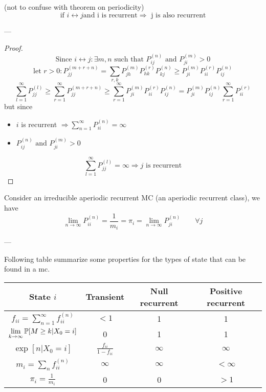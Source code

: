 	\begin{theorem}
		(not to confuse with theorem on periodicity)
		$$\text{if } i\leftrightarrow j \text{and i is recurrent} \Rightarrow \text{ j is also recurrent}$$
	\end{theorem}
	---
	\begin{proof}
		$$\text{Since } i\leftrightarrow j : \exists m,n \text{ such that } P_{ij}^{(n)} \text{ and } P_{ji}^{(m)} > 0$$
		$$\text{let } r>0 : P_{jj}^{(m+r+n)} = \sum\limits_{r, k} P_{jh}^{(m)} P_{hk}^{(r)} P_{kj}^{(n)} \geq P_{ji}^{(m)}  P_{ii}^{(r)}  P_{ij}^{(n)}$$
		$$\sum\limits_{l=1}^\infty P_{jj}^{(l)} \geq \sum\limits_{r=1}^\infty P_{jj}^{(m+r+n)} \geq \sum\limits_{r=1}^\infty P_{ji}^{(m)}  P_{ii}^{(r)}  P_{ij}^{(n)} = P_{ji}^{(m)} P_{ij}^{(n)} \sum\limits_{r=1}^\infty P_{ii}^{(r)}$$
		but since \begin{itemize}
		\item$i$ is recurrent $\Rightarrow \sum\limits_{n=1}^\infty P_{ii}^{(n)} = \infty$
		\item $P_{ij}^{(n)} \text{ and } P_{ji}^{(m)} > 0$
		\end{itemize}
		$$\sum\limits_{l=1}^\infty P_{jj}^{(l)} = \infty \Rightarrow j \text{ is recurrent}$$
	\end{proof}

	\begin{theorem}
		Consider an irreducible aperiodic recurrent MC (an aperiodic recurrent class), we have
		$$ \lim_{n\to \infty} P_{ii}^{(n)} = \frac{1}{m_i} = \pi_i = \lim_{n\to\infty} P_{ji}^{(n)} \qquad \forall j$$
	\end{theorem}

	---

	Following table summarize some properties for the types of state that can be found in a \gls{mc}.

	{\renewcommand{\arraystretch}{1.2}
	\begin{center}
		\begin{tabular}{|c||c|c|c|}
			\hline
			State $i$ & Transient & Null recurrent & Positive recurrent \\ \hline
			$f_{ii} = \sum\limits_{n=1}^\infty f_{ii}^{(n)}$ & $<1$ & 1 & 1 \\ \hline
			$\lim\limits_{k \to \infty } \mathbb{P}[M \geq k | X_0=i]$ & 0 & 1 & 1 \\ \hline
			$\exp[n|X_0=i]$ & $\frac{f_{ii}}{1-f_{ii}}$ & $\infty$ & $\infty$ \\ \hline
			$m_i = \sum\limits_n f_{ii}^{(n)}$ & $\infty$ & $\infty$ & $<\infty$ \\ \hline
			$\pi_i = \frac{1}{m_i}$ & 0 & 0 & $>1$ \\ \hline
		\end{tabular}
	\end{center}}

